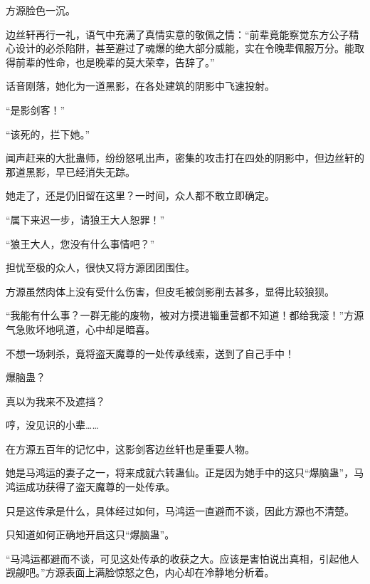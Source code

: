 \begin{this_body}
方源脸色一沉。

边丝轩再行一礼，语气中充满了真情实意的敬佩之情：“前辈竟能察觉东方公子精心设计的必杀陷阱，甚至避过了魂爆的绝大部分威能，实在令晚辈佩服万分。能取得前辈的性命，也是晚辈的莫大荣幸，告辞了。”

话音刚落，她化为一道黑影，在各处建筑的阴影中飞速投射。

“是影剑客！”

“该死的，拦下她。”

闻声赶来的大批蛊师，纷纷怒吼出声，密集的攻击打在四处的阴影中，但边丝轩的那道黑影，早已经消失无踪。

她走了，还是仍旧留在这里？一时间，众人都不敢立即确定。

“属下来迟一步，请狼王大人恕罪！”

“狼王大人，您没有什么事情吧？”

担忧至极的众人，很快又将方源团团围住。

方源虽然肉体上没有受什么伤害，但皮毛被剑影削去甚多，显得比较狼狈。

“我能有什么事？一群无能的废物，被对方摸进辎重营都不知道！都给我滚！”方源气急败坏地吼道，心中却是暗喜。

不想一场刺杀，竟将盗天魔尊的一处传承线索，送到了自己手中！

爆脑蛊？

真以为我来不及遮挡？

哼，没见识的小辈……

在方源五百年的记忆中，这影剑客边丝轩也是重要人物。

她是马鸿运的妻子之一，将来成就六转蛊仙。正是因为她手中的这只“爆脑蛊”，马鸿运成功获得了盗天魔尊的一处传承。

只是这传承是什么，具体经过如何，马鸿运一直避而不谈，因此方源也不清楚。

只知道如何正确地开启这只“爆脑蛊”。

“马鸿运都避而不谈，可见这处传承的收获之大。应该是害怕说出真相，引起他人觊觎吧。”方源表面上满脸惊怒之色，内心却在冷静地分析着。

\end{this_body}

